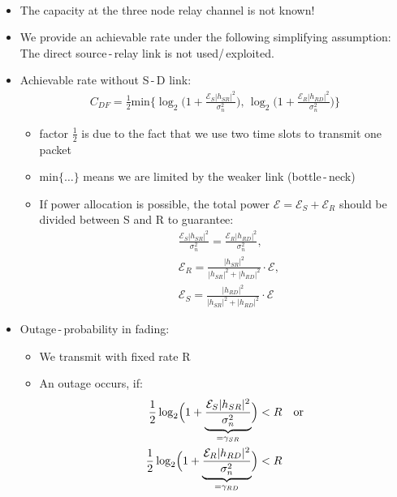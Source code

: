 \documentclass[a4paper, 10pt]{article}
\begin{document}
\paragraph{}
\begin{itemize}
	\item The capacity at the three node relay channel is not known!
	\item We provide an achievable rate under the following simplifying assumption: The direct source\,-\,relay link is not used/\,exploited.
	\item Achievable rate without S\,-\,D link:
	\begin{align*}
		\boxed{C_{DF} = \frac{1}{2}\text{min}\bigl\{\log_2\bigl(1 + \frac{\mathcal{E}_S|h_{SR}|^2}{\sigma_n^2}\bigr),\,\log_2\bigl(1 + \frac{\mathcal{E}_R|h_{RD}|^2}{\sigma_n^2}\bigr)\bigr\} }	
	\end{align*}	 
	\begin{itemize}
		\item factor $\frac{1}{2} $ is due to the fact that we use two time slots to transmit one packet
		\item $\text{min}\{\ldots\} $ means we are limited by the weaker link (bottle\,-\,neck)
		\item If power allocation is possible, the total power $ \mathcal{E} = \mathcal{E}_S + \mathcal{E}_R $ should be divided between S and R to guarantee:
		\begin{align*}
			&\frac{\mathcal{E}_S|h_{SR}|^2}{\sigma_n^2} = \frac{\mathcal{E}_R|h_{RD}|^2}{\sigma_n^2},\\
			&\mathcal{E}_R = \frac{|h_{SR}|^2}{|h_{SR}|^2 + |h_{RD}|^2}\cdot\mathcal{E},\\
			&\mathcal{E}_S = \frac{|h_{RD}|^2}{|h_{SR}|^2 + |h_{RD}|^2}\cdot\mathcal{E}
		\end{align*}
	\end{itemize}
	\item Outage\,-\,probability in fading:
	\begin{itemize}
		\item We transmit with fixed rate R
		\item An outage occurs, if:
		\begin{align*}
			\frac{1}{2}\log_2\Bigl(1 + \underbrace{\frac{\mathcal{E}_S|h_{SR}|^2}{\sigma_n^2}}_{= \gamma_{SR}}\Bigr) &< R \quad	\text{or} \\
			\frac{1}{2}\log_2\Bigl(1 + \underbrace{\frac{\mathcal{E}_R|h_{RD}|^2}{\sigma_n^2}}_{= \gamma_{RD}}\Bigr) &< R
		\end{align*}

\end{itemize}
\end{itemize}
\end{document}
